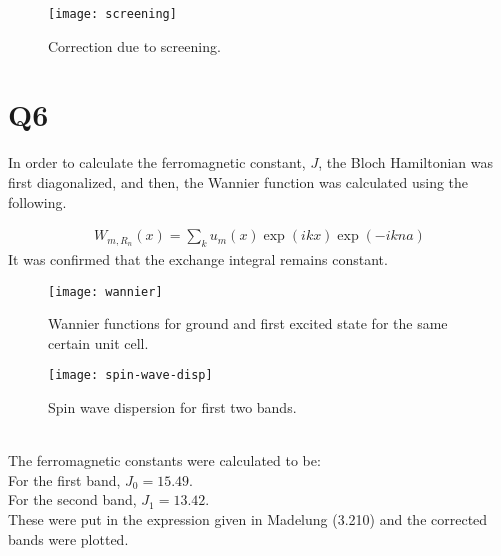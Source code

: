 \documentclass[]{report}
\begin{document}
\begin{figure}[h!]
	\centering
	\texttt{[image: screening]}
	\caption{Correction due to screening.}
	\label{fig:screening}
\end{figure}

\section{Q6}
In order to calculate the ferromagnetic constant, $J$, the Bloch Hamiltonian was first diagonalized, and then, the Wannier function was calculated using the following.

\begin{align}
W_{m,R_n}(x) = \sum_k u_{m}(x)\exp(i k x) \exp(-i k n a)
\end{align}
It was confirmed that the exchange integral remains constant.
\begin{figure}[h!]
	\centering
	\texttt{[image: wannier]}
	\caption{Wannier functions for ground and first excited state for the same certain unit cell.}
	\label{fig:wannier}
\end{figure}
\begin{figure}[h!]
	\centering
	\texttt{[image: spin-wave-disp]}
	\caption{Spin wave dispersion for first two bands.}
	\label{fig:spin-wave-disp}
\end{figure}\\
The ferromagnetic constants were calculated to be:\\
For the first band, $J_0 = 15.49$.\\
For the second band, $J_1 = 13.42$.\\

These were put in the expression given in Madelung (3.210) and the corrected bands were plotted.
\end{document}
